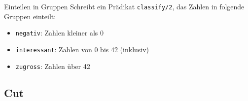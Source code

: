 \documentclass{beamer}
\begin{document}
\begin{frame}{Einteilen in Gruppen}
    Schreibt ein Prädikat \texttt{classify/2}, das Zahlen in folgende Gruppen einteilt:

    \begin{itemize}
        \item \texttt{negativ}: Zahlen kleiner als 0
        \item \texttt{interessant}: Zahlen von 0 bis 42 (inklusiv)
        \item \texttt{zugross}: Zahlen über 42
    \end{itemize}

\end{frame}

\subsection{Cut}
\end{document}
